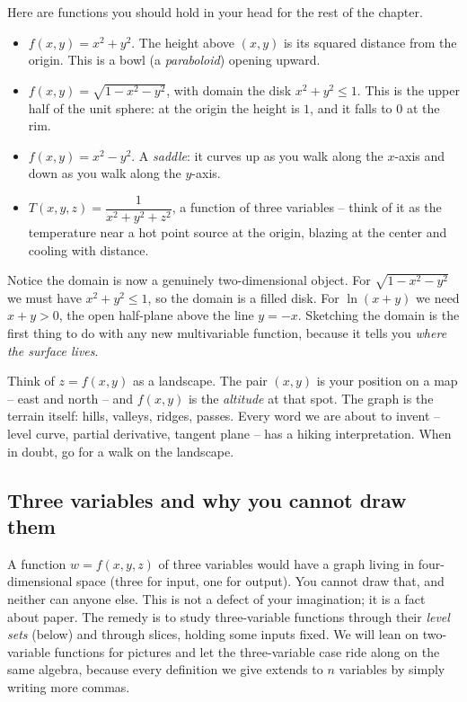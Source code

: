Here are functions you should hold in your head for the rest of the chapter.

\begin{example}
\label{ch32:ex-zoo}
\begin{itemize}
  \item $f(x,y) = x^2 + y^2$. The height above $(x,y)$ is its squared distance from the
  origin. This is a bowl (a \emph{paraboloid}) opening upward.
  \item $f(x,y) = \sqrt{1 - x^2 - y^2}$, with domain the disk $x^2+y^2 \le 1$. This is the
  upper half of the unit sphere: at the origin the height is $1$, and it falls to $0$ at the
  rim.
  \item $f(x,y) = x^2 - y^2$. A \emph{saddle}: it curves up as you walk along the $x$-axis
  and down as you walk along the $y$-axis.
  \item $T(x,y,z) = \dfrac{1}{x^2+y^2+z^2}$, a function of three variables -- think of it as
  the temperature near a hot point source at the origin, blazing at the center and cooling
  with distance.
\end{itemize}
\end{example}

Notice the domain is now a genuinely two-dimensional object. For $\sqrt{1-x^2-y^2}$ we must
have $x^2+y^2 \le 1$, so the domain is a filled disk. For $\ln(x+y)$ we need $x+y>0$, the
open half-plane above the line $y=-x$. Sketching the domain is the first thing to do with any
new multivariable function, because it tells you \emph{where the surface lives}.

\begin{intuitionbox}
Think of $z = f(x,y)$ as a landscape. The pair $(x,y)$ is your position on a map -- east and
north -- and $f(x,y)$ is the \emph{altitude} at that spot. The graph is the terrain itself:
hills, valleys, ridges, passes. Every word we are about to invent -- level curve, partial
derivative, tangent plane -- has a hiking interpretation. When in doubt, go for a walk on the
landscape.
\end{intuitionbox}

\subsection*{Three variables and why you cannot draw them}

A function $w=f(x,y,z)$ of three variables would have a graph living in four-dimensional
space (three for input, one for output). You cannot draw that, and neither can anyone else.
This is not a defect of your imagination; it is a fact about paper. The remedy is to study
three-variable functions through their \emph{level sets} (below) and through slices, holding
some inputs fixed. We will lean on two-variable functions for pictures and let the
three-variable case ride along on the same algebra, because every definition we give extends
to $n$ variables by simply writing more commas.


